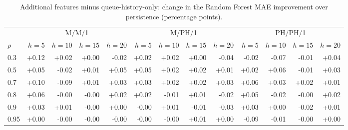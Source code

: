 \begin{table}[htbp]
\centering
\footnotesize
\setlength{\tabcolsep}{3.5pt}
\caption{Additional features minus queue-history-only: change in the Random Forest MAE improvement over persistence (percentage points).}
\label{tab:consolidated_rich}
\begin{tabular}{lrrrrrrrrrrrr}
\toprule
 & \multicolumn{4}{c}{M/M/1} & \multicolumn{4}{c}{M/PH/1} & \multicolumn{4}{c}{PH/PH/1} \\
\cmidrule(lr){2-5}\cmidrule(lr){6-9}\cmidrule(lr){10-13}
$\rho$ & $h=5$ & $h=10$ & $h=15$ & $h=20$ & $h=5$ & $h=10$ & $h=15$ & $h=20$ & $h=5$ & $h=10$ & $h=15$ & $h=20$ \\
\midrule
0.3 & +0.12 & +0.02 & +0.00 & -0.02 & +0.02 & +0.02 & +0.00 & -0.04 & -0.02 & -0.07 & -0.01 & +0.04 \\
0.5 & +0.05 & -0.02 & +0.01 & +0.05 & +0.05 & +0.02 & +0.02 & +0.01 & +0.02 & +0.06 & -0.01 & +0.03 \\
0.7 & +0.10 & -0.09 & +0.01 & +0.03 & +0.03 & +0.02 & +0.02 & +0.03 & +0.06 & +0.03 & +0.02 & +0.01 \\
0.8 & +0.06 & -0.00 & -0.00 & +0.02 & +0.02 & -0.01 & +0.01 & -0.02 & +0.05 & -0.02 & -0.00 & +0.02 \\
0.9 & +0.03 & +0.01 & -0.00 & +0.00 & -0.00 & +0.01 & -0.01 & -0.03 & +0.03 & +0.00 & -0.02 & +0.01 \\
0.95 & +0.00 & -0.00 & -0.00 & -0.00 & -0.00 & -0.00 & +0.01 & +0.00 & -0.09 & -0.01 & -0.00 & +0.00 \\
\bottomrule
\end{tabular}
\end{table}

